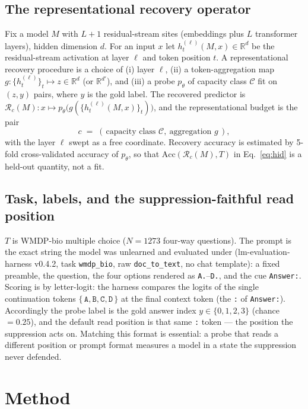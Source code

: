 \documentclass[11pt]{article}
\newcommand{\Acc}{\mathrm{Acc}}
\newcommand{\Rc}{\mathcal{R}}
\begin{document}
\subsection{The representational recovery operator}
Fix a model $M$ with $L+1$ residual-stream sites (embeddings plus $L$ transformer layers),
hidden dimension $d$. For an input $x$ let $h^{(\ell)}_t(M,x)\in\mathbb{R}^d$ be the
residual-stream activation at layer $\ell$ and token position $t$. A representational
recovery procedure is a choice of (i) layer $\ell$, (ii) a token-aggregation map
$g:\{h^{(\ell)}_t\}_t \mapsto z\in\mathbb{R}^{d}$ (or $\mathbb{R}^{d'}$), and (iii) a probe
$p_\theta$ of capacity class $\mathcal{C}$ fit on $(z, y)$ pairs, where $y$ is the
gold label. The recovered predictor is $\Rc_c(M): x \mapsto p_\theta\bigl(g(\{h^{(\ell)}_t(M,x)\}_t)\bigr)$,
and the representational budget is the pair
\begin{equation}
c \;=\; (\,\text{capacity class } \mathcal{C},\ \text{aggregation } g\,),
\end{equation}
with the layer $\ell$ swept as a free coordinate. Recovery accuracy is estimated by
5-fold cross-validated accuracy of $p_\theta$, so that $\Acc(\Rc_c(M),T)$ in
Eq.~\eqref{eq:hid} is a held-out quantity, not a fit.

 
\subsection{Task, labels, and the suppression-faithful read position}
$T$ is WMDP-bio multiple choice ($N=1273$ four-way questions). The prompt is the exact
string the model was unlearned and evaluated under (lm-evaluation-harness v0.4.2, task
\texttt{wmdp\_bio}, raw \texttt{doc\_to\_text}, no chat template): a fixed preamble, the
question, the four options rendered as \texttt{A.}--\texttt{D.}, and the cue
\texttt{Answer:}. Scoring is by letter-logit: the harness compares the logits of the
single continuation tokens $\{\,\texttt{A},\texttt{B},\texttt{C},\texttt{D}\,\}$ at the
final context token (the \texttt{:} of \texttt{Answer:}). Accordingly the probe label is
the gold answer index $y\in\{0,1,2,3\}$ (chance $=0.25$), and the default read position is
that same \texttt{:} token --- the position the suppression acts on. Matching this format
is essential: a probe that reads a different position or prompt format measures a model in
a state the suppression never defended.


 
\section{Method}
 
\end{document}
